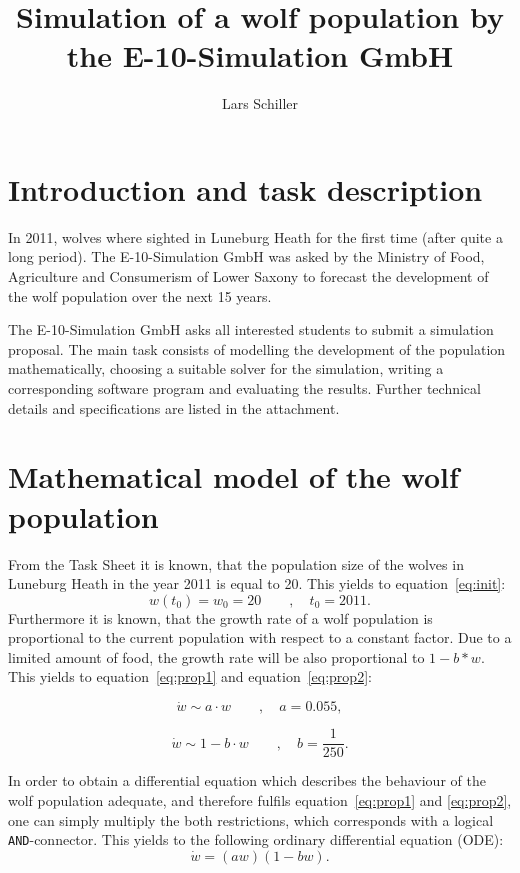 \documentclass[11pt,a4paper,oneside]{scrartcl}
\author{Lars Schiller}
\title{Simulation of a wolf population by the
E-10-Simulation GmbH}
\begin{document}
\maketitle
\tableofcontents

\section{Introduction and task description}
In 2011, wolves where sighted in Luneburg Heath for the first time (after quite a long
period). The E-10-Simulation GmbH was asked by the Ministry of Food, Agriculture and
Consumerism of Lower Saxony to forecast the development of the wolf population over
the next 15 years.

The E-10-Simulation GmbH asks all interested students to submit a simulation proposal.
The main task consists of modelling the development of the population mathematically,
choosing a suitable solver for the simulation, writing a corresponding software program
and evaluating the results. Further technical details and specifications are listed in the
attachment.


\section{Mathematical model of the wolf population}

From the Task Sheet it is known, that the population size of the wolves in Luneburg Heath in the year 2011 is equal to 20. This yields to equation~\ref{eq:init}:
\begin{equation}
w(t_0) = w_0 = 20 \qquad,\quad t_0 = 2011.
\label{eq:init}
\end{equation}
Furthermore it is known, that the growth rate of a wolf population is proportional to the current population with respect to a constant factor. Due to a limited amount of food, the growth rate will be also proportional to $1-b*w$.  This yields to equation~\ref{eq:prop1} and equation~\ref{eq:prop2}:

\begin{equation}
\dot{w} \sim a\cdot w \qquad,\quad a = 0.055,
\label{eq:prop1}
\end{equation}

\begin{equation}
\dot{w} \sim 1-b\cdot w \qquad,\quad b = \frac{1}{250}.
\label{eq:prop2}
\end{equation}

In order to obtain a differential equation which describes the behaviour of the wolf population adequate, and therefore fulfils  equation~\ref{eq:prop1} and \ref{eq:prop2}, one can simply multiply the both restrictions, which corresponds with a logical \texttt{AND}-connector. This yields to the following ordinary differential equation (ODE):
\begin{equation}
\dot{w} = \left(aw\right)\left(1-bw\right).
\label{eq:ODE}
\end{equation}
\end{document}
